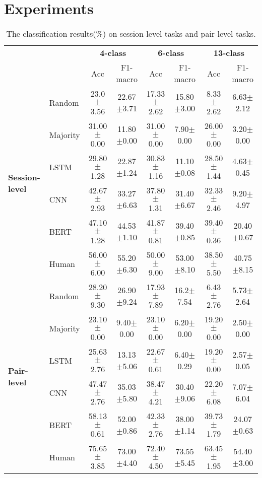 \section{Experiments}
\label{experiments}
\begin{table*}[th]
	\centering
	\begin{tabular}{@{}llcccccc@{}}
		\toprule[1.5pt]
		&               				& \multicolumn{2}{c}{\textbf{4-class}} & \multicolumn{2}{c}{\textbf{6-class}} & \multicolumn{2}{c}{\textbf{13-class}} \\ 
		& & Acc & F1-macro                 & Acc & F1-macro                  & Acc & F1-macro \\
		\midrule
		\multirow{6}{*}{\textbf{Session-level}}&Random   &23.0$\pm$3.56 &22.67$\pm$3.71 &17.33$\pm$2.62 & 15.80$\pm$3.00& 8.33$\pm$2.62& 6.63$\pm$2.12  \\		
		&Majority    &31.00$\pm$0.00 &11.80$\pm$0.00 &31.00$\pm$0.00 &7.90$\pm$0.00 &26.00$\pm$0.00 &3.20$\pm$0.00 \\
		&LSTM    &29.80$\pm$1.28 &22.87$\pm$1.24 &30.83$\pm$1.16 &11.10$\pm$0.08 &28.50$\pm$1.44 &4.63$\pm$0.45 \\
		&CNN    &42.67$\pm$2.93 & 33.27$\pm$6.63&37.80$\pm$1.31 & 31.40$\pm$6.67 &32.33$\pm$2.46 &9.20$\pm$4.97 \\
		&BERT   &47.10$\pm$1.28 &44.53$\pm$1.10 &41.87$\pm$0.81 &39.40$\pm$0.85 &39.40$\pm$0.36 &20.40$\pm$0.67 \\
		&Human &56.00$\pm$6.00 &55.20$\pm$6.30&50.00$\pm$9.00&53.00$\pm$8.10&38.50$\pm$5.50&40.75$\pm$8.15 \\ 
		\midrule
		\multirow{6}{*}{\textbf{Pair-level}}&Random   &28.20$\pm$9.30 &26.90$\pm$9.24 &17.93$\pm$7.89 &16.2$\pm$7.54 &6.43$\pm$2.76 & 5.73$\pm$2.64 \\		
		&Majority    &23.10$\pm$0.00 &9.40$\pm$0.00 &23.10$\pm$0.00 &6.20$\pm$0.00 &19.20$\pm$0.00 & 2.50$\pm$0.00\\
		&LSTM    &25.63$\pm$2.76 &13.13$\pm$5.06 &22.67$\pm$0.61 &6.40$\pm$0.29 &19.20$\pm$0.00 &2.57$\pm$0.05 \\	
		&CNN    &47.47$\pm$2.76 &35.03$\pm$5.80 &38.47$\pm$4.21 &30.40$\pm$9.06 & 22.20$\pm$6.08& 7.07$\pm$6.04\\	
		&BERT   &58.13$\pm$0.61 &52.00$\pm$0.86 & 42.33$\pm$2.76&38.00$\pm$1.14 &39.73$\pm$1.79 &24.07$\pm$0.63 \\
		&Human & 75.65$\pm$3.85 &73.00$\pm$4.40 & 72.40$\pm$4.50&73.55$\pm$5.45 &63.45$\pm$1.95 &54.40$\pm$3.00 \\ 
		\bottomrule[1.5pt]
		
	\end{tabular}
	\caption{The classification results(\%) on session-level tasks and pair-level tasks.}
	\label{tab:results}
\end{table*}

